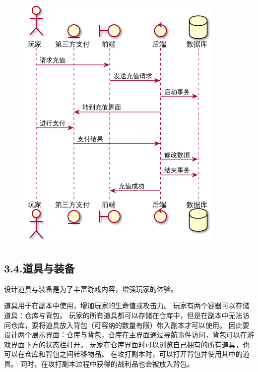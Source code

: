\documentclass{article}
\begin{document}
\begin{figure}[tbp]%
\begin{mdcenter}%

\noindent{}\includegraphics[keepaspectratio=true,width=\dimwidth{0.70}]{./img/9}{}%

\mdhr{}%

\noindent{}%
\end{mdcenter}%
\end{figure}%

\subsection{3.4.\hspace*{0.5em}道具与装备}\label{34}%

\noindent{}设计道具与装备是为了丰富游戏内容，增强玩家的体验。%

道具用于在副本中使用，增加玩家的生命值或攻击力。 玩家有两个容器可以存储道具：仓库与背包。 玩家的所有道具都可以存储在仓库中，但是在副本中无法访问仓库，要将道具放入背包（可容纳的数量有限）带入副本才可以使用。 因此要设计两个展示界面：仓库与背包，仓库在主界面通过导航事件访问，背包可以在游戏界面下方的状态栏打开。 玩家在仓库界面时可以浏览自己拥有的所有道具，也可以在仓库和背包之间转移物品。 在攻打副本时，可以打开背包并使用其中的道具。 同时，在攻打副本过程中获得的战利品也会被放入背包。%
\end{document}

